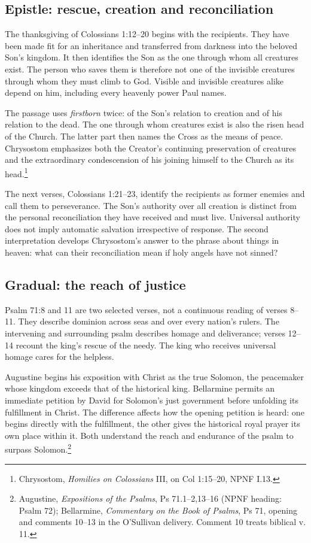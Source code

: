 \subsection{Epistle: rescue, creation and reconciliation}
The thanksgiving of Colossians 1:12--20 begins with the recipients. They have been made fit for an inheritance and transferred from darkness into the beloved Son's kingdom. It then identifies the Son as the one through whom all creatures exist. The person who saves them is therefore not one of the invisible creatures through whom they must climb to God. Visible and invisible creatures alike depend on him, including every heavenly power Paul names.

The passage uses \emph{firstborn} twice: of the Son's relation to creation and of his relation to the dead. The one through whom creatures exist is also the risen head of the Church. The latter part then names the Cross as the means of peace. Chrysostom emphasizes both the Creator's continuing preservation of creatures and the extraordinary condescension of his joining himself to the Church as its head.\footnote{Chrysostom, \emph{Homilies on Colossians} III, on Col 1:15--20, NPNF I.13.}

The next verses, Colossians 1:21--23, identify the recipients as former enemies and call them to perseverance. The Son's authority over all creation is distinct from the personal reconciliation they have received and must live. Universal authority does not imply automatic salvation irrespective of response. The second interpretation develops Chrysostom's answer to the phrase about things in heaven: what can their reconciliation mean if holy angels have not sinned?

\subsection{Gradual: the reach of justice}
Psalm 71:8 and 11 are two selected verses, not a continuous reading of verses 8--11. They describe dominion across seas and over every nation's rulers. The intervening and surrounding psalm describes homage and deliverance; verses 12--14 recount the king's rescue of the needy. The king who receives universal homage cares for the helpless.

Augustine begins his exposition with Christ as the true Solomon, the peacemaker whose kingdom exceeds that of the historical king. Bellarmine permits an immediate petition by David for Solomon's just government before unfolding its fulfillment in Christ. The difference affects how the opening petition is heard: one begins directly with the fulfillment, the other gives the historical royal prayer its own place within it. Both understand the reach and endurance of the psalm to surpass Solomon.\footnote{Augustine, \emph{Expositions of the Psalms}, Ps 71.1--2,13--16 (NPNF heading: Psalm 72); Bellarmine, \emph{Commentary on the Book of Psalms}, Ps 71, opening and comments 10--13 in the O'Sullivan delivery. Comment 10 treats biblical v. 11.}

